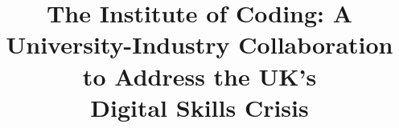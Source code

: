 \documentclass[conference]{IEEEtran}
\begin{document}
\title{The Institute of Coding: A University-Industry Collaboration to
  Address the UK's\\Digital Skills Crisis}


\maketitle
\end{document}
